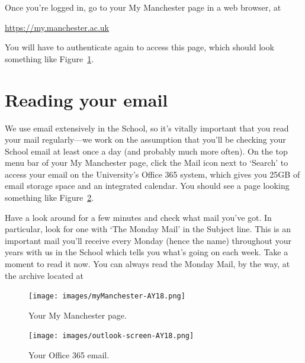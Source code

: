Once you're logged in, go to your My Manchester page in a web browser, at

\url{https://my.manchester.ac.uk}

You will have to authenticate again to access this page, which should look something like Figure~\ref{figure:welc-mymanchester}.


\section{Reading your email}

We use email extensively in the School, so it's vitally important that
you read your mail regularly---we work on the assumption that you'll
be checking your School email at least once a day (and probably much
more often). On the top menu bar of your My Manchester page, click the Mail icon next to `Search'
to access your email on the University's Office 365 system, which gives you 25GB of
email storage space and an integrated calendar. You should see a page
looking something like Figure~\ref{figure:welc-mail365}.

\begin{firstonly}
Have a look around for a few minutes and check what mail you've
got. In particular, look for one with `The Monday Mail' in the
Subject line. This is an important mail you'll receive every Monday
(hence the name) throughout your years with us in the
School which  tells you what's going on each week. Take a moment to
read it now. You can always read the Monday Mail, by the way, at the
archive located at

  
\end{firstonly}

\begin{figure}
\centerline{\texttt{[image: images/myManchester-AY18.png]}}
\caption{Your My Manchester page.}
\label{figure:welc-mymanchester}
\end{figure}

\begin{figure}
\centerline{\texttt{[image: images/outlook-screen-AY18.png]}}
\caption{Your Office 365 email.}
\label{figure:welc-mail365}
\end{figure}

